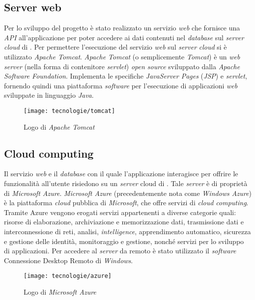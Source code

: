 \newpage

\subsection{Server web}

Per lo sviluppo del progetto è stato realizzato un servizio \textit{web} che fornisce una \textit{API} all'applicazione per poter accedere ai dati contenuti nel \textit{database} sul \textit{server} \textit{cloud} di \visione{}. Per permettere l'esecuzione del servizio \textit{web} sul \textit{server} \textit{cloud} si è utilizzato \textit{Apache Tomcat}. \textit{Apache Tomcat} (o semplicemente \textit{Tomcat}) è un \textit{web} \textit{server} (nella forma di contenitore \textit{servlet}) \textit{open source} sviluppato dalla \textit{Apache Software Foundation}. Implementa le specifiche \textit{JavaServer Pages} (\textit{JSP}) e \textit{servlet}, fornendo quindi una piattaforma \textit{software} per l'esecuzione di applicazioni \textit{web} sviluppate in linguaggio \textit{Java}.

\begin{figure}[!h] 
    \centering 
    \texttt{[image: tecnologie/tomcat]} 
    \caption{Logo di \textit{Apache Tomcat}}
\end{figure}

\subsection{Cloud computing}

Il servizio \textit{web} e il \textit{database} con il quale l'applicazione interagisce per offrire le funzionalità all'utente risiedono su un \textit{server} cloud di \visione{}. Tale \textit{server} è di proprietà di \textit{Microsoft Azure}. \textit{Microsoft Azure} (precedentemente nota come \textit{Windows Azure}) è la piattaforma \textit{cloud} pubblica di \textit{Microsoft}, che offre servizi di \textit{cloud computing}. Tramite Azure vengono erogati servizi appartenenti a diverse categorie quali: risorse di elaborazione, archiviazione e memorizzazione dati, trasmissione dati e interconnessione di reti, analisi, \textit{intelligence}, apprendimento automatico, sicurezza e gestione delle identità, monitoraggio e gestione, nonché servizi per lo sviluppo di applicazioni. Per accedere al \textit{server} da remoto è stato utilizzato il \textit{software} Connessione Desktop Remoto di \textit{Windows}.

\begin{figure}[!h] 
    \centering 
    \texttt{[image: tecnologie/azure]} 
    \caption{Logo di \textit{Microsoft Azure}}
\end{figure}

